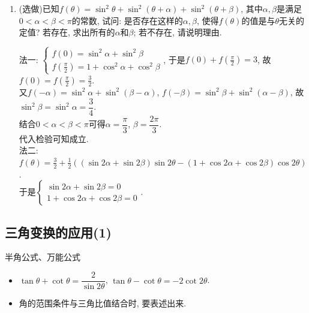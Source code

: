 \begin{enumerate}
\item (选做)已知$f(\theta)=\sin^2\theta+\sin^2(\theta+\alpha)+\sin^2(\theta+\beta)$, 
其中$\alpha,\beta$是满足$0<\alpha<\beta<\pi$的常数, 试问: 是否存在这样的$\alpha,\beta$, 使得$f(\theta)$的值是与$\theta$无关的定值? 
若存在, 求出所有的$\alpha$和$\beta$; 若不存在, 请说明理由. 
\begin{jieda}
法一: 
$\begin{cases}
f(0)=\sin^2\alpha+\sin^2\beta\\
f(\frac{\pi}{2})=1+\cos^2\alpha+\cos^2\beta
\end{cases}$, 于是$f(0)+f(\frac{\pi}{2})=3$, 故$f(0)=f(\frac{\pi}{2})=\frac{3}{2}$. \\
又$f(-\alpha)=\sin^2\alpha+\sin^2(\beta-\alpha)$, $f(-\beta)=\sin^2\beta+\sin^2(\alpha-\beta)$, 
故$\sin^2\beta=\sin^2\alpha=\dfrac{3}{4}$. \\
结合$0<\alpha<\beta<\pi$可得$\alpha=\dfrac{\pi}{3}$, $\beta=\dfrac{2\pi}{3}$. \\
代入检验可知成立. \\
法二: $f(\theta)=\frac{3}{2}+\frac{1}{2}((\sin2\alpha+\sin2\beta)\sin2\theta-(1+\cos2\alpha+\cos2\beta)\cos2\theta)$. \\
于是$\begin{cases}
\sin2\alpha+\sin2\beta=0\\
1+\cos2\alpha+\cos2\beta=0
\end{cases}$. 
\end{jieda}
\end{enumerate}




\subsection{三角变换的应用(1)}
\zsd 半角公式、万能公式

\begin{tcolorbox}
\begin{itemize}
\item $\tan\theta+\cot\theta=\dfrac{2}{\sin2\theta}$, $\tan\theta-\cot\theta=-2\cot2\theta$. 
\item 角的范围条件与三角比值结合时, 要表述出来. 
\end{itemize}
\end{tcolorbox}

